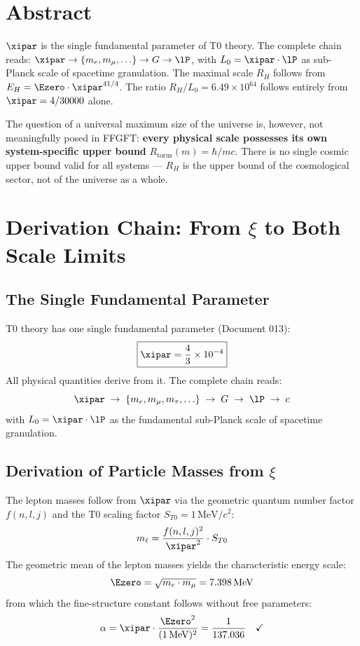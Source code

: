 \section*{Abstract}

$\xipar$ is the single fundamental parameter of T0 theory. The complete chain reads: $\xipar \to \{m_e, m_\mu, \ldots\} \to G \to \lP$, with $L_0 = \xipar \cdot \lP$ as sub-Planck scale of spacetime granulation. The maximal scale $R_H$ follows from $E_H = \Ezero \cdot \xipar^{41/4}$. The ratio $R_H/L_0 = 6{.}49 \times 10^{64}$ follows entirely from $\xipar = 4/30000$ alone.

The question of a universal maximum size of the universe is, however, not meaningfully posed in FFGFT: \textbf{every physical scale possesses its own system-specific upper bound} $R_\text{torus}(m) = \hbar/mc$. There is no single cosmic upper bound valid for all systems — $R_H$ is the upper bound of the cosmological sector, not of the universe as a whole.

\section{Derivation Chain: From \texorpdfstring{$\xi$}{xi} to Both Scale Limits}

\subsection{The Single Fundamental Parameter}

T0 theory has one single fundamental parameter (Document 013):
\begin{equation}
	\boxed{\xipar = \frac{4}{3} \times 10^{-4}}
\end{equation}
All physical quantities derive from it. The complete chain reads:
\begin{equation}
	\xipar \;\to\; \{m_e, m_\mu, m_\tau, \ldots\} \;\to\; G \;\to\; \lP \;\to\; c
\end{equation}
with $L_0 = \xipar \cdot \lP$ as the fundamental sub-Planck scale of spacetime granulation.

\subsection{Derivation of Particle Masses from \texorpdfstring{$\xi$}{xi}}

The lepton masses follow from $\xipar$ via the geometric quantum number factor $f(n,l,j)$ and the T0 scaling factor $S_{T0} = 1\,\text{MeV}/c^2$:
\begin{equation}
	m_\ell = \frac{f(n,l,j)^2}{\xipar^2} \cdot S_{T0}
\end{equation}
The geometric mean of the lepton masses yields the characteristic energy scale:
\begin{equation}
	\Ezero = \sqrt{m_e \cdot m_\mu} = 7{.}398\,\text{MeV}
\end{equation}
from which the fine-structure constant follows without free parameters:
\begin{equation}
	\alpha = \xipar \cdot \frac{\Ezero^2}{(1\,\text{MeV})^2} = \frac{1}{137{.}036} \quad \checkmark
\end{equation}

